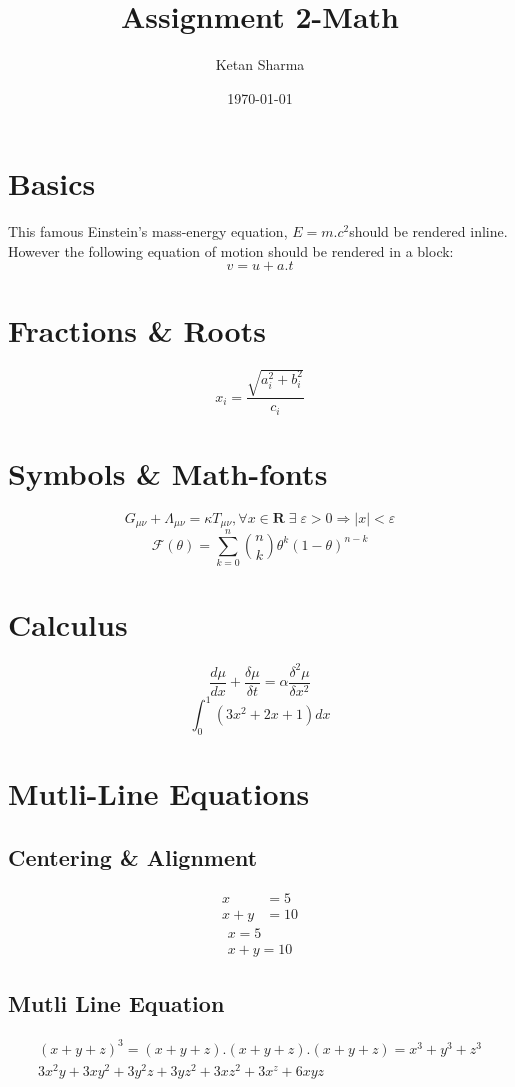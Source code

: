 \documentclass[12pt,a4paper]{article}
\begin{document}
	\title{Assignment 2-Math}
	\author{Ketan Sharma}
	\date{\today}
	\maketitle
	\section{Basics}
	This famous Einstein’s mass-energy equation, $E=m.c^2$should be rendered inline.
	However the following equation of motion should be rendered in a block:
	\[v=u+a.t\]
	\section{Fractions \& Roots}
	\[
		x_i=\frac{\sqrt{a_i^2+b_i^2}}{c_i}
	\]
	\section{Symbols \& Math-fonts}
	\[
		G_{\mu\nu}+\Lambda_{\mu\nu} = \kappa T_{\mu\nu}, \forall x\in \mathbf{R}\; \exists \; \varepsilon > 0 \Rightarrow |x|< \varepsilon
	\]
	\[
		\mathcal{F}(\theta)=\sum_{k=0}^{n}\binom{n}{k}\theta^k(1-\theta)^{n-k}
	\]
	\section{Calculus}
	\[
		\frac{d\mu}{dx}+\frac{\delta\mu}{\delta t}=\alpha\frac{\delta^2\mu}{\delta x^2} 
	\]
	\[
		\int_{0}^{1}(3x^2+2x+1)dx
	\]
	\section{Mutli-Line Equations}
	\subsection{Centering \& Alignment }
	\begin{center}
		\begin{align}
			x&=5\\
			x+y&=10
		\end{align}
		\begin{gather}
			x=5\\
			x+y=10
		\end{gather}
	\end{center}
	\subsection{Mutli Line Equation}
		\begin{multline*}
			(x+y+z)^3=(x+y+z).(x+y+z).(x+y+z)=x^3+y^3+z^3\\
			3x^2y+3xy^2+3y^2z+3yz^2+3xz^2+3x^z+6xyz
		\end{multline*}
\end{document}
